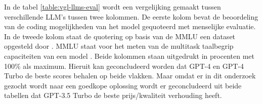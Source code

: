 \begin{table}[h!]
\centering
{}
\caption{Vergelijking LLM's op basis van beoordeling van menselijke evaluatie en MMLU \autocite{ArtificialAnalysis2024}}
\label{table:vgl-llms-eval}
\end{table}

In de tabel \ref{table:vgl-llms-eval} wordt een vergelijking gemaakt tussen verschillende LLM's tussen twee kolommen. 
De eerste kolom bevat de beoordeling van de coding mogelijkheden van het model gequoteerd met menselijke evaluatie. 
In de tweede kolom staat de quotering op basis van de MMLU een dataset opgesteld door \textcite{Hendrycks2020}.
MMLU staat voor het meten van de multitask taalbegrip capaciteiten van een model \autocite{Hendrycks2020}.
Beide kolommen staan uitgedrukt in procenten met 100\% als maximum.
Hieruit kan geconcludeerd worden dat GPT-4 en GPT-4 Turbo de beste scores behalen op beide vlakken.
Maar omdat er in dit onderzoek gezocht wordt naar een goedkope oplossing wordt er geconcludeerd uit beide tabellen dat GPT-3.5 Turbo de beste prijs/kwaliteit verhouding heeft.
